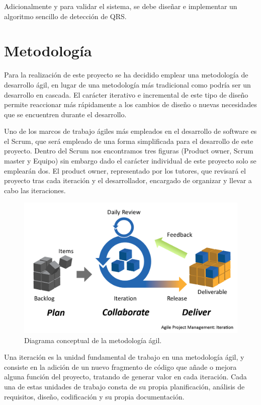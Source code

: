     Adicionalmente y para validar el sistema, se debe diseñar e implementar un algoritmo sencillo de detección de QRS. 
    \clearpage



\section{Metodología}

    Para la realización de este proyecto se ha decidido emplear una metodología de desarrollo ágil, en lugar de una metodología más tradicional como podría ser un desarrollo en cascada. El carácter iterativo e incremental de este tipo de diseño permite reaccionar más rápidamente a los cambios de diseño o nuevas necesidades que se encuentren durante el desarrollo.

    Uno de los marcos de trabajo ágiles más empleados en el desarrollo de software es el Scrum, que será empleado de una forma simplificada para el desarrollo de este proyecto. Dentro del Scrum nos encontramos tres figuras (Product owner, Scrum master y Equipo) sin embargo dado el carácter individual de este proyecto solo se emplearán dos. El product owner, representado por los tutores, que revisará el proyecto tras cada iteración y el desarrollador, encargado de organizar y llevar a cabo las iteraciones.

    \begin{figure}[H]  
        \centering
            \includegraphics[width =0.9\linewidth]{figuras/Agile.png}
        \caption{Diagrama conceptual de la metodología ágil.}
        \label{fig:agile}
    \end{figure}

    Una iteración es la unidad fundamental de trabajo en una metodología ágil, y consiste en la adición de un nuevo fragmento de código que añade o mejora alguna función del proyecto, tratando de generar valor en cada iteración. Cada una de estas unidades de trabajo consta de su propia planificación, análisis de requisitos, diseño, codificación y su propia documentación.

